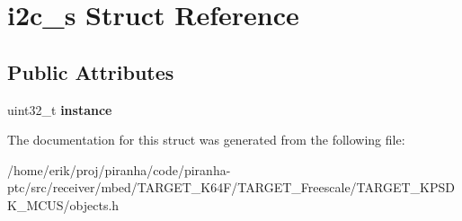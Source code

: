 \hypertarget{structi2c__s}{}\section{i2c\+\_\+s Struct Reference}
\label{structi2c__s}
\subsection*{Public Attributes}
\begin{DoxyCompactItemize}
\item 
uint32\+\_\+t {\bfseries instance}\hypertarget{structi2c__s_a282d2ac71ba7498175ddc6bbb321fdfc}{}\label{structi2c__s_a282d2ac71ba7498175ddc6bbb321fdfc}

\end{DoxyCompactItemize}


The documentation for this struct was generated from the following file\+:\begin{DoxyCompactItemize}
\item 
/home/erik/proj/piranha/code/piranha-\/ptc/src/receiver/mbed/\+T\+A\+R\+G\+E\+T\+\_\+\+K64\+F/\+T\+A\+R\+G\+E\+T\+\_\+\+Freescale/\+T\+A\+R\+G\+E\+T\+\_\+\+K\+P\+S\+D\+K\+\_\+\+M\+C\+U\+S/objects.\+h\end{DoxyCompactItemize}

